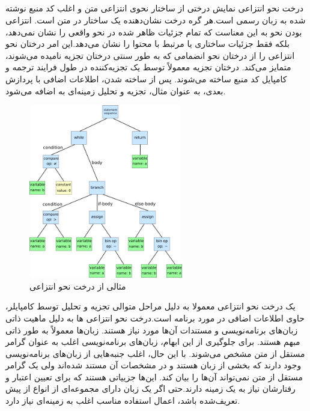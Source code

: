 \subsection {}
درخت نحو انتزاعی نمایش درختی از ساختار نحوی انتزاعی متن و اغلب کد منبع نوشته شده به زبان رسمی است.هر گره درخت نشان‌دهنده یک ساختار در متن است.
انتزاعی بودن نحو به این معناست که تمام جزئیات ظاهر شده در نحو واقعی را نشان نمی‌دهد، بلکه فقط جزئیات ساختاری یا مرتبط با محتوا را نشان می‌دهد.این امر درختان نحو انتزاعی را از درختان نحو انضمامی که به طور سنتی درختان تجزیه نامیده می‌شوند، متمایز می‌کند. درختان تجزیه معمولاً توسط یک تجزیه‌کننده در طول فرایند ترجمه و کامپایل کد منبع ساخته می‌شوند. پس از ساخته شدن، اطلاعات اضافی با پردازش بعدی، به عنوان مثال، تجزیه و تحلیل زمینه‌ای به  اضافه می‌شود.
\begin{figure}[H]
	\centering
	\includegraphics[width=0.6\textwidth]{figures/AST.png}
	\caption{مثالی از درخت نحو انتزاعی }
	\label{fig:AST}
\end{figure}
\clearpage

یک درخت نحو انتزاعی  معمولا به دلیل مراحل متوالی تجزیه و تحلیل توسط کامپایلر، حاوی اطلاعات اضافی در مورد برنامه است.درخت نحو انتزاعی ها به دلیل ماهیت ذاتی زبان‌های برنامه‌نویسی و مستندات آن‌ها مورد نیاز هستند. زبان‌ها معمولاً به طور ذاتی مبهم هستند. برای جلوگیری از این ابهام، زبان‌های برنامه‌نویسی اغلب به عنوان گرامر مستقل از متن  مشخص می‌شوند. با این حال، اغلب جنبه‌هایی از زبان‌های برنامه‌نویسی وجود دارند که بخشی از زبان هستند و در مشخصات آن مستند شده‌اند ولی یک گرامر مستقل از متن  نمی‌تواند آن‌ها را بیان کند. این‌ها جزییاتی هستند که برای تعیین اعتبار و رفتارشان نیاز به یک زمینه دارند.حتی اگر یک زبان دارای مجموعه‌ای از انواع از پیش تعریف‌شده باشد، اعمال استفاده مناسب اغلب به زمینه‌ای نیاز دارد.

